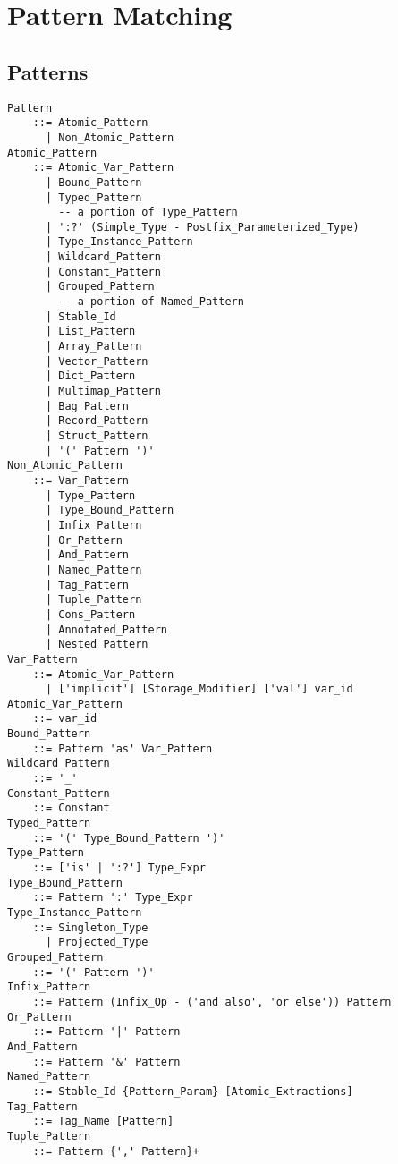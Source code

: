 
\chapter{Pattern Matching}
\label{sec:pattern-matching}

\minitoc

\newpage




\section{Patterns}
\label{sec:patterns}


\grammar\begin{lstlisting}
Pattern
    ::= Atomic_Pattern
      | Non_Atomic_Pattern
Atomic_Pattern 
    ::= Atomic_Var_Pattern
      | Bound_Pattern
      | Typed_Pattern
        -- a portion of Type_Pattern
      | ':?' (Simple_Type - Postfix_Parameterized_Type)  
      | Type_Instance_Pattern
      | Wildcard_Pattern
      | Constant_Pattern
      | Grouped_Pattern
        -- a portion of Named_Pattern
      | Stable_Id  
      | List_Pattern
      | Array_Pattern
      | Vector_Pattern
      | Dict_Pattern
      | Multimap_Pattern
      | Bag_Pattern
      | Record_Pattern
      | Struct_Pattern
      | '(' Pattern ')'
Non_Atomic_Pattern 
    ::= Var_Pattern
      | Type_Pattern
      | Type_Bound_Pattern
      | Infix_Pattern
      | Or_Pattern
      | And_Pattern
      | Named_Pattern
      | Tag_Pattern
      | Tuple_Pattern
      | Cons_Pattern
      | Annotated_Pattern
      | Nested_Pattern
Var_Pattern 
    ::= Atomic_Var_Pattern
      | ['implicit'] [Storage_Modifier] ['val'] var_id
Atomic_Var_Pattern 
    ::= var_id
Bound_Pattern 
    ::= Pattern 'as' Var_Pattern
Wildcard_Pattern 
    ::= '_'
Constant_Pattern 
    ::= Constant
Typed_Pattern 
    ::= '(' Type_Bound_Pattern ')'
Type_Pattern 
    ::= ['is' | ':?'] Type_Expr
Type_Bound_Pattern 
    ::= Pattern ':' Type_Expr
Type_Instance_Pattern 
    ::= Singleton_Type
      | Projected_Type
Grouped_Pattern 
    ::= '(' Pattern ')'
Infix_Pattern 
    ::= Pattern (Infix_Op - ('and also', 'or else')) Pattern
Or_Pattern 
    ::= Pattern '|' Pattern
And_Pattern 
    ::= Pattern '&' Pattern
Named_Pattern 
    ::= Stable_Id {Pattern_Param} [Atomic_Extractions]
Tag_Pattern
    ::= Tag_Name [Pattern]
Tuple_Pattern 
    ::= Pattern {',' Pattern}+

\end{lstlisting}
